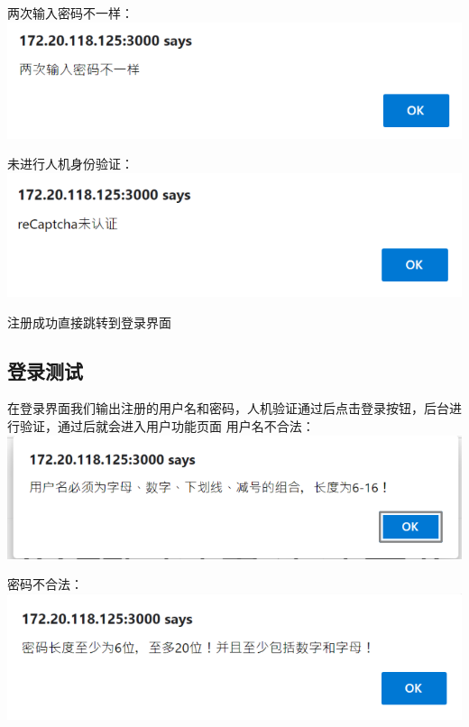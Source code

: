 \documentclass{ctexart}
\begin{document}
两次输入密码不一样：\\

\includegraphics[width=\textwidth]{Clipboard_2021-01-02-14-11-42.png}

未进行人机身份验证：\\

\includegraphics[width=\textwidth]{Clipboard_2021-01-02-14-12-51.png}

注册成功直接跳转到登录界面

\subsection{登录测试}


在登录界面我们输出注册的用户名和密码，人机验证通过后点击登录按钮，后台进行验证，通过后就会进入用户功能页面
用户名不合法：\\

\includegraphics[width=\textwidth]{Clipboard_2021-01-02-14-11-07.png}

密码不合法：\\

\includegraphics[width=\textwidth]{Clipboard_2021-01-02-14-12-08.png}
\end{document}
